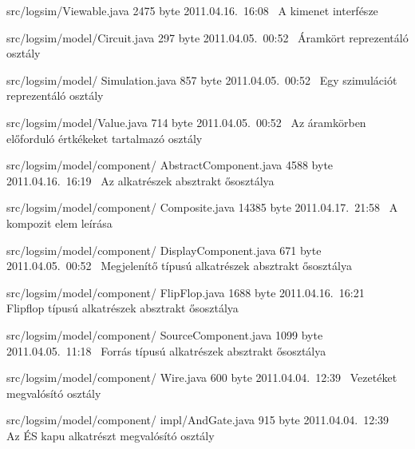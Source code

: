 \begin{fajllista}
\fajl
{src/logsim/Viewable.java} %
{2475 byte} %
{2011.04.16.~16:08~} %
{A kimenet interfésze} %

\fajl
{src/logsim/model/Circuit.java} %
{297 byte} %
{2011.04.05.~00:52~} %
{Áramkört reprezentáló osztály} %

\fajl
{src/logsim/model/\newline
Simulation.java} %
{857 byte} %
{2011.04.05.~00:52~} %
{Egy szimulációt reprezentáló osztály} %

\fajl
{src/logsim/model/Value.java} %
{714 byte} %
{2011.04.05.~00:52~} %
{Az áramkörben előforduló értkékeket tartalmazó osztály} %

\fajl
{src/logsim/model/component/\newline
AbstractComponent.java} %
{4588 byte} %
{2011.04.16.~16:19~} %
{Az alkatrészek absztrakt ősosztálya} %

\fajl
{src/logsim/model/component/\newline
Composite.java} %
{14385 byte} %
{2011.04.17.~21:58~} %
{A kompozit elem leírása} %

\fajl
{src/logsim/model/component/\newline
DisplayComponent.java} %
{671 byte} %
{2011.04.05.~00:52~} %
{Megjelenítő típusú alkatrészek absztrakt ősosztálya} %

\fajl
{src/logsim/model/component/\newline
FlipFlop.java} %
{1688 byte} %
{2011.04.16.~16:21~} %
{Flipflop típusú alkatrészek absztrakt ősosztálya} %

\fajl
{src/logsim/model/component/\newline
SourceComponent.java} %
{1099 byte} %
{2011.04.05.~11:18~} %
{Forrás típusú alkatrészek absztrakt ősosztálya} %

\fajl
{src/logsim/model/component/\newline
Wire.java} %
{600 byte} %
{2011.04.04.~12:39~} %
{Vezetéket megvalósító osztály} %

\fajl
{src/logsim/model/component/\newline
impl/AndGate.java} %
{915 byte} %
{2011.04.04.~12:39~} %
{Az ÉS kapu alkatrészt megvalósító osztály} %


\end{fajllista}
